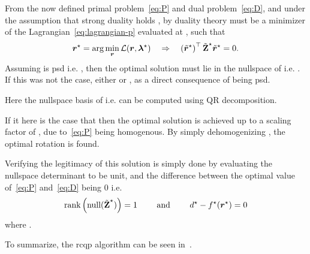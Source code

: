 From the now defined primal problem~\ref{eq:P} and dual problem~\ref{eq:D}, and under the assumption that strong duality holds , by duality theory  must be a minimizer of the Lagrangian~\ref{eq:lagrangian-p} evaluated at \mvar{\tilde{\vec{\lambda}}^\star}, such that
%
\begin{equation}
	\bm{r}^\star = \arg\min_{\bm{r}} \mathcal{L}(\bm{r},\bm{\lambda}^\star) \quad \Rightarrow \quad \left( \tilde{\bm{r}}^\star \right)^\top \tilde{\bm{\mathrm{Z}}}^\star \tilde{\bm{r}}^\star = 0.
\end{equation}
Assuming  is \gls{psd} i.e. , then the optimal solution  must lie in the nullspace of  i.e. . If this was not the case, either  or , as a direct consequence of  being \gls{psd}. \medskip

Here the nullspace basis  of  i.e.  can be computed using QR decomposition. \medskip

If it here is the case that  then the optimal solution  is achieved up to a scaling factor of , due to~\ref{eq:P} being homogenous. By simply dehomogenizing , the optimal rotation  is found. \medskip

Verifying the legitimacy of this solution is simply done by evaluating the nullspace determinant to be unit, and the difference between the optimal value of~\ref{eq:P} and~\ref{eq:D} being \num{0} i.e.
%
\begin{equation}
	\text{rank} \left(\text{null}( \tilde{\bm{\mathrm{Z}}}^\star )\right) = 1 \qquad \text{ and } \qquad  d^\star - f^\star(\bm{r}^\star) = 0
\end{equation}
where . \medskip

To summarize, the \gls{rcqp} algorithm can be seen in~.

